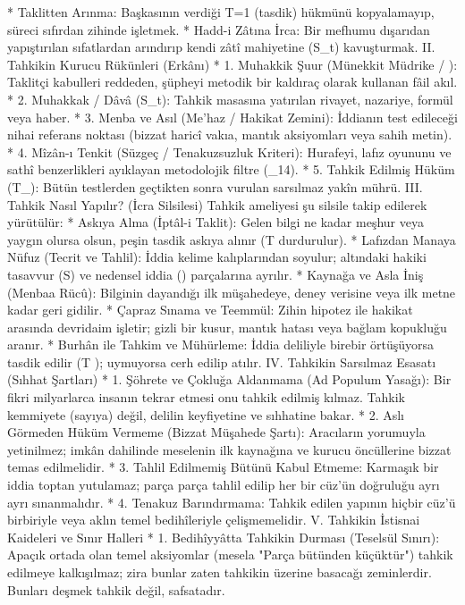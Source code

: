 \documentclass[11pt,a4paper]{article}
\begin{document}
 * Taklitten Arınma: Başkasının verdiği T=1 (tasdik) hükmünü kopyalamayıp, süreci sıfırdan zihinde işletmek.
 * Hadd-i Zâtına İrca: Bir mefhumu dışarıdan yapıştırılan sıfatlardan arındırıp kendi zâtî mahiyetine (S_t) kavuşturmak.
II. Tahkikin Kurucu Rükünleri (Erkânı)
 * 1. Muhakkik Şuur (Münekkit Müdrike / ): Taklitçi kabulleri reddeden, şüpheyi metodik bir kaldıraç olarak kullanan fâil akıl.
 * 2. Muhakkak / Dâvâ (S_t): Tahkik masasına yatırılan rivayet, nazariye, formül veya haber.
 * 3. Menba ve Asıl (Me'haz / Hakikat Zemini): İddianın test edileceği nihai referans noktası (bizzat haricî vakıa, mantık aksiyomları veya sahih metin).
 * 4. Mîzân-ı Tenkit (Süzgeç / Tenakuzsuzluk Kriteri): Hurafeyi, lafız oyununu ve sathî benzerlikleri ayıklayan metodolojik filtre (_{14}).
 * 5. Tahkik Edilmiş Hüküm (T_{}): Bütün testlerden geçtikten sonra vurulan sarsılmaz yakîn mührü.
III. Tahkik Nasıl Yapılır? (İcra Silsilesi)
Tahkik ameliyesi şu silsile takip edilerek yürütülür:
 * Askıya Alma (İptâl-i Taklit): Gelen bilgi ne kadar meşhur veya yaygın olursa olsun, peşin tasdik askıya alınır (T durdurulur).
 * Lafızdan Manaya Nüfuz (Tecrit ve Tahlil): İddia kelime kalıplarından soyulur; altındaki hakiki tasavvur (S) ve nedensel iddia () parçalarına ayrılır.
 * Kaynağa ve Asla İniş (Menbaa Rücû): Bilginin dayandığı ilk müşahedeye, deney verisine veya ilk metne kadar geri gidilir.
 * Çapraz Sınama ve Teemmül: Zihin hipotez ile hakikat arasında devridaim işletir; gizli bir kusur, mantık hatası veya bağlam kopukluğu aranır.
 * Burhân ile Tahkim ve Mühürleme: İddia deliliyle birebir örtüşüyorsa tasdik edilir (T ); uymuyorsa cerh edilip atılır.
IV. Tahkikin Sarsılmaz Esasatı (Sıhhat Şartları)
 * 1. Şöhrete ve Çokluğa Aldanmama (Ad Populum Yasağı):
   Bir fikri milyarlarca insanın tekrar etmesi onu tahkik edilmiş kılmaz. Tahkik kemmiyete (sayıya) değil, delilin keyfiyetine ve sıhhatine bakar.
 * 2. Aslı Görmeden Hüküm Vermeme (Bizzat Müşahede Şartı):
   Aracıların yorumuyla yetinilmez; imkân dahilinde meselenin ilk kaynağına ve kurucu öncüllerine bizzat temas edilmelidir.
 * 3. Tahlil Edilmemiş Bütünü Kabul Etmeme:
   Karmaşık bir iddia toptan yutulamaz; parça parça tahlil edilip her bir cüz'ün doğruluğu ayrı ayrı sınanmalıdır.
 * 4. Tenakuz Barındırmama:
   Tahkik edilen yapının hiçbir cüz'ü birbiriyle veya aklın temel bedihîleriyle çelişmemelidir.
V. Tahkikin İstisnai Kaideleri ve Sınır Halleri
 * 1. Bedihîyyâtta Tahkikin Durması (Teselsül Sınırı):
   Apaçık ortada olan temel aksiyomlar (mesela "Parça bütünden küçüktür") tahkik edilmeye kalkışılmaz; zira bunlar zaten tahkikin üzerine basacağı zeminlerdir. Bunları deşmek tahkik değil, safsatadır.
\end{document}
